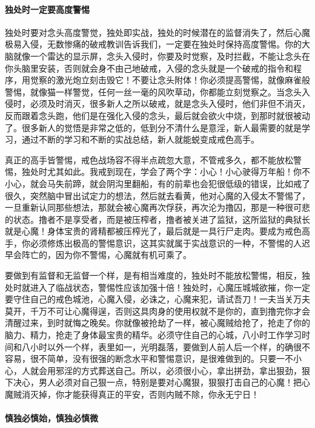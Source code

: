 \paragraph{独处时一定要高度警惕}

独处时要对念头高度警觉，独处即实战，独处的时候潜在的监督消失了，然后心魔极易入侵，无数惨痛的破戒教训告诉我们，一定要在独处时保持高度警惕。你的大脑就像一个雷达的显示屏，念头入侵时，你要及时觉察，及时拦截，不能让念头在你头脑里安装，否则就会身不由己地破戒，入侵的念头就是一个破戒的指令和程序，用觉察的激光炮立刻击毁它！不要让念头附体！你必须提高警惕，就像麻雀般警惕，就像猫一样警觉，任何一丝一毫的风吹草动，你都能立刻觉察之。当念头入侵时，必须及时消灭，很多新人之所以破戒，就是念头入侵时，他们非但不消灭，反而跟着念头跑，他们是在强化入侵的念头，最后就会欲火中烧，到那时就很被动了。很多新人的觉悟是非常之低的，低到分不清什么是意淫，新人最需要的就是学习，通过不断的学习和不断的实战总结，新人就能蜕变成戒色高手。

真正的高手皆警惕，戒色战场容不得半点疏忽大意，不管戒多久，都不能放松警惕，独处时尤其如此。我戒到现在，学会了两个字：小心！小心驶得万年船！你不小心，就会马失前蹄，就会阴沟里翻船，有的前辈也会犯很低级的错误，比如戒了很久，突然脑中冒出试定力的想法，然后就去看黄，他对心魔的入侵太不警惕了，一旦重新认同那些想法，那就会被心魔再次俘获，再次沦为撸囚，那是一种很可悲的状态。撸者不是享受者，而是被压榨者，撸者被关进了监狱，这所监狱的典狱长就是心魔！身体宝贵的肾精都被压榨光了，最后就是一具行尸走肉。要成为戒色高手，你必须修炼出极高的警惕意识，这其实就属于实战意识的一种，不警惕的人迟早会阵亡的，因为你不警惕，心魔就有机可乘了。

要做到有监督和无监督一个样，是有相当难度的，独处时不能放松警惕，相反，独处时就进入了临战状态，警惕性应该加强十倍！独处时，心魔压城城欲摧，你一定要守住自己的戒色城池，心魔入侵，必诛之，心魔来犯，请试吾刀！一夫当关万夫莫开，千万不可让心魔得逞，否则这具肉身的使用权就不是你的，直到撸完你才会清醒过来，到时就悔之晚矣。你就像被抢劫了一样，被心魔贼给抢了，抢走了你的脑力、精力，抢走了身体最宝贵的精华。必须守住自己的心城，八小时工作学习时间和八小时以外一个样，表里如一，光明磊落，要做到人前人后一个样，的确很不容易，很不简单，没有很强的断念水平和警惕意识，是很难做到的。只要一不小心，人就会用邪淫的方式葬送自己。所以，必须很小心，拿出拼劲，拿出狠劲，狠下决心，男人必须对自己狠一点，特别是要对心魔狠，狠狠打击自己的心魔！把心魔贼消灭掉，你才能获得真正的平安，否则内贼不除，你永无宁日！

\paragraph{慎独必慎始，慎独必慎微}

